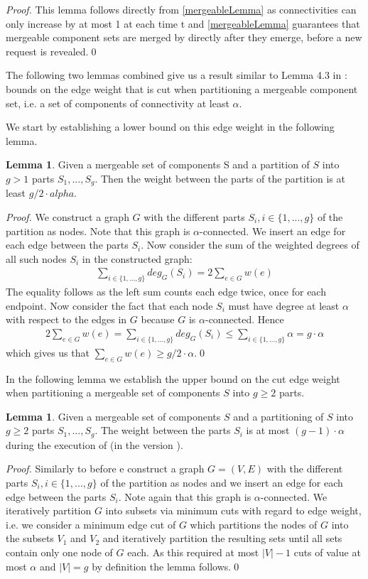 \documentclass[a4paper,xcolor=dvipsnames, tikz, 12pt]{article}
\newcommand{\nl}{\newline}
\newcommand{\crep}{\text{C{\scriptsize REP}}}
\newcommand{\adjDel}{\text{C{\scriptsize REP}-A{\scriptsize DJ}}}
\theoremstyle{definition}
\newtheorem{lemma}[defi]{Lemma}
\begin{document}
\textit{Proof.} This lemma follows directly from \cref{mergeableLemma} as connectivities can only increase by at most 1 at each time t and \cref{mergeableLemma} guarantees that mergeable component sets are merged by \crep{} directly after they emerge, before a new request is revealed.\qed\nl

The following two lemmas combined give us a result similar to Lemma 4.3 in \cite{Avin2015}: bounds on the edge weight that is cut when partitioning a mergeable component set, i.e. a set of components of connectivity at least $\alpha$.

We start by establishing a lower bound on this edge weight in the following lemma.

\begin{lemma}
	\label{cut_lemma}
	Given a mergeable set of components S and a partition of $S$ into $g>1$ parts $S_1,...,S_g$. Then the weight between the parts of the partition is at least $g/2 \cdot alpha$.
\end{lemma}
\textit{Proof.} We construct a graph $G$ with the different parts $S_i, i\in\{1,...,g\}$ of the partition as nodes. Note that this graph is $\alpha$-connected. We insert an edge for each edge between the parts $S_i$. Now consider the sum of the weighted degrees of all such nodes $S_i$ in the constructed graph:
\begin{align*}
\sum_{i\in\{1,...,g\}}deg_G(S_i)=2\sum_{e\in G}w(e)
\end{align*}
The equality follows as the left sum counts each edge twice, once for each endpoint.
Now consider the fact that each node $S_i$ must have degree at least $\alpha$ with respect to the edges in $G$ because $G$ is $\alpha$-connected. Hence
\begin{align*}
2\sum_{e\in G}w(e)=\sum_{i\in\{1,...,g\}}deg_G(S_i)\leq\sum_{i\in\{1,...,g\}}\alpha=g\cdot\alpha
\end{align*}
which gives us that $\sum_{e\in G}w(e)\geq g/2\cdot\alpha$.\qed\nl

In the following lemma we establish the upper bound on the cut edge weight when partitioning a mergeable set of components $S$ into $g\geq2$ parts.

\begin{lemma}
	\label{cut_lemma_upper}
	Given a mergeable set of components $S$ and a partitioning of $S$ into $g\geq2$ parts $S_1,...,S_g$. The weight between the parts $S_i$ is at most $(g-1)\cdot\alpha$ during the execution of \crep{} (in the version \adjDel{}).
\end{lemma}
\textit{Proof.} Similarly to before e construct a graph $G=(V,E)$ with the different parts $S_i, i\in\{1,...,g\}$ of the partition as nodes and we insert an edge for each edge between the parts $S_i$. Note again that this graph is $\alpha$-connected. We iteratively partition $G$ into subsets via minimum cuts with regard to edge weight, i.e. we consider a minimum edge cut of $G$ which partitions the nodes of $G$ into the subsets $V_1$ and $V_2$ and iteratively partition the resulting sets until all sets contain only one node of $G$ each. As this required at most $|V|-1$ cuts of value at most $\alpha$ and $|V|=g$ by definition the lemma follows.\qed
\end{document}
